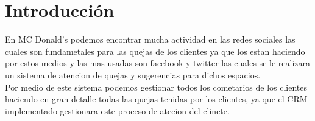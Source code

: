 \chapter*{Introducci\'on}
En MC Donald's podemos encontrar mucha actividad en las redes sociales las cuales son fundametales para las quejas de los clientes ya que los estan haciendo por estos medios y las mas usadas son facebook y twitter las cuales se le realizara un sistema de atencion de quejas y sugerencias para dichos espacios.
%
\\%
Por medio de este sistema podemos gestionar todos los cometarios de los clientes haciendo en gran detalle todas las quejas tenidas por los clientes, ya que el CRM implementado gestionara este proceso de atecion del clinete.%
\\%
\\%